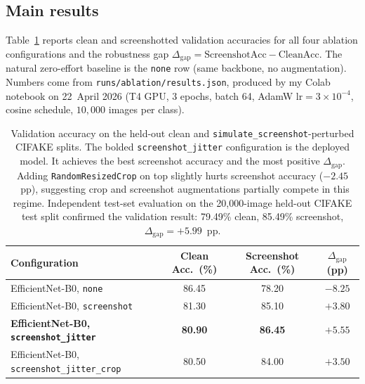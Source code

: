 \documentclass{article}
\begin{document}
\subsection{Main results}
\label{sec:results}

Table~\ref{tab:main-results} reports clean and screenshotted
validation accuracies for all four ablation configurations and the
robustness gap $\Delta_{\text{gap}} = \text{ScreenshotAcc} -
\text{CleanAcc}$. The natural zero-effort baseline is the
\texttt{none} row (same backbone, no augmentation). Numbers come
from \texttt{runs/ablation/results.json}, produced by my Colab
notebook on 22~April 2026 (T4 GPU, 3 epochs, batch 64, AdamW
$\text{lr}=3\!\times\!10^{-4}$, cosine schedule, $10{,}000$ images
per class).

\begin{table}[t]
\centering
\begin{tabular}{lccc}
\toprule
Configuration                                                & Clean Acc.\ (\%) & Screenshot Acc.\ (\%) & $\Delta_{\text{gap}}$ (pp) \\
\midrule
EfficientNet-B0, \texttt{none}                               & 86.45            & 78.20                 & $-8.25$  \\
EfficientNet-B0, \texttt{screenshot}                         & 81.30            & 85.10                 & $+3.80$  \\
\textbf{EfficientNet-B0, \texttt{screenshot\_jitter}}        & \textbf{80.90}   & \textbf{86.45}        & $\mathbf{+5.55}$ \\
EfficientNet-B0, \texttt{screenshot\_jitter\_crop}           & 80.50            & 84.00                 & $+3.50$  \\
\bottomrule
\end{tabular}
\caption{Validation accuracy on the held-out clean and
\texttt{simulate\_screenshot}-perturbed CIFAKE splits. The bolded
\texttt{screenshot\_jitter} configuration is the deployed model. It
achieves the best screenshot accuracy and the most positive
$\Delta_{\text{gap}}$. Adding \texttt{RandomResizedCrop} on top
slightly hurts screenshot accuracy ($-2.45$~pp), suggesting crop and
screenshot augmentations partially compete in this regime.
Independent test-set evaluation on the 20{,}000-image held-out
CIFAKE test split confirmed the validation result: 79.49\% clean,
85.49\% screenshot, $\Delta_{\text{gap}}=+5.99$~pp.}
\label{tab:main-results}
\end{table}
\end{document}
